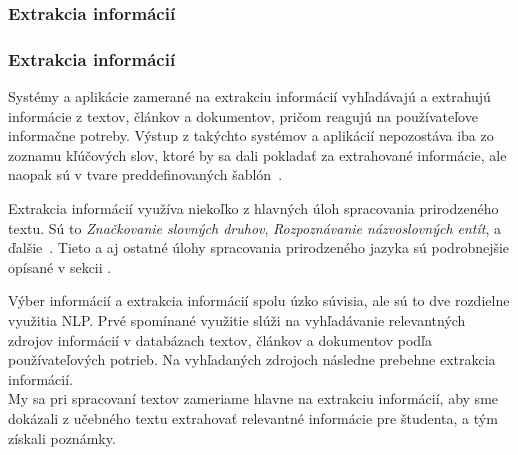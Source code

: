 %
%
{
	\subsubsection{Extrakcia informácií}
}
{
	\subsubsection{Extrakcia informácií}
}
\label{subsubsec:information_extraction}
Systémy a aplikácie zamerané na extrakciu informácií vyhľadávajú a extrahujú informácie z textov, článkov a dokumentov, pričom reagujú na používateľove informačne potreby. Výstup z takýchto systémov a aplikácií nepozostáva iba zo zoznamu kľúčových slov, ktoré by sa dali pokladať za extrahované informácie, ale naopak sú v tvare preddefinovaných šablón~\cite{Preeti}.

Extrakcia informácií využíva niekoľko z hlavných úloh spracovania prirodzeného textu. Sú to \textit{Značkovanie slovných druhov}, \textit{Rozpoznávanie názvoslovných entít}, a ďalšie~\cite{Preeti}. Tieto a aj ostatné úlohy spracovania prirodzeného jazyka sú podrobnejšie opísané v sekcii .

Výber informácií a extrakcia informácií spolu úzko súvisia, ale sú to dve rozdielne využitia NLP. Prvé spomínané využitie slúži na vyhľadávanie relevantných zdrojov informácií v databázach textov, článkov a dokumentov podľa používateľových potrieb. Na vyhľadaných zdrojoch následne prebehne extrakcia informácií. 
\\

My sa pri spracovaní textov zameriame hlavne na extrakciu informácií, aby sme dokázali z učebného textu extrahovať relevantné informácie pre študenta, a tým získali poznámky.

